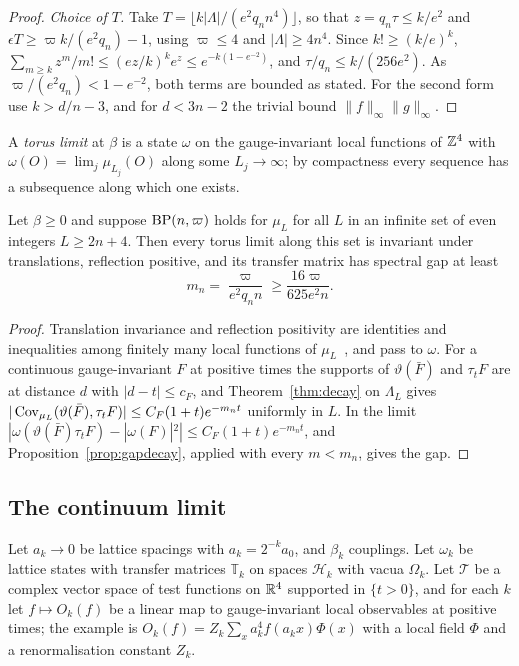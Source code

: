 \begin{proof}
\emph{Choice of $T$.} Take $T=\lfloor k|\Lambda|/(e^2q_nn^4)\rfloor$, so that
$z=q_n\tau\le k/e^2$ and $\epsilon T\ge\varpi k/(e^2q_n)-1$, using $\varpi\le4$
and $|\Lambda|\ge4n^4$. Since $k!\ge(k/e)^k$, $\sum_{m\ge k}z^m/m!\le(ez/k)^ke^z\le
e^{-k(1-e^{-2})}$, and $\tau/q_n\le k/(256e^2)$. As $\varpi/(e^2q_n)<1-e^{-2}$,
both terms are bounded as stated. For the second form use $k>d/n-3$, and for
$d<3n-2$ the trivial bound $\|f\|_\infty\|g\|_\infty$.
\end{proof}

A \emph{torus limit} at $\beta$ is a state $\omega$ on the gauge-invariant local
functions of $\mathbb{Z}^4$ with $\omega(O)=\lim_j\mu_{L_j}(O)$ along some $L_j\to\infty$;
by compactness every sequence has a subsequence along which one exists.

\begin{corollary}\label{cor:latticegap}
Let $\beta\ge0$ and suppose $\mathrm{BP}(n,\varpi)$ holds for $\mu_L$ for all $L$ in an
infinite set of even integers $L\ge2n+4$. Then every torus limit along this
set is invariant under translations, reflection positive, and its transfer
matrix has spectral gap at least
\[
m_n=\frac{\varpi}{e^2q_nn}\ge\frac{16\varpi}{625e^2n}.
\]
\end{corollary}

\begin{proof}
Translation invariance and reflection positivity are identities and
inequalities among finitely many local functions of $\mu_L$~\cite{OSei78}, and
pass to $\omega$. For a continuous gauge-invariant $F$ at positive times the
supports of $\vartheta(\bar F)$ and $\tau_tF$ are at distance $d$ with $|d-t|\le
c_F$, and Theorem~\ref{thm:decay} on $\Lambda_L$ gives $|\operatorname{Cov}_{\mu_L}(\vartheta(\bar
F),\tau_tF)|\le C_F(1+t)e^{-m_nt}$ uniformly in $L$. In the limit
$|\omega(\vartheta(\bar F)\tau_tF)-|\omega(F)|^2|\le C_F(1+t)e^{-m_nt}$, and
Proposition~\ref{prop:gapdecay}, applied with every $m<m_n$, gives the gap.
\end{proof}

\subsection{The continuum limit}

Let $a_k\to0$ be lattice spacings with $a_k=2^{-k}a_0$, and $\beta_k$ couplings.
Let $\omega_k$ be lattice states with transfer matrices $\mathbb T_k$ on spaces
$\mathcal H_k$ with vacua $\Omega_k$. Let $\mathcal T$ be a complex vector space of
test functions on $\mathbb{R}^4$ supported in $\{t>0\}$, and for each $k$ let $f\mapsto
O_k(f)$ be a linear map to gauge-invariant local observables at positive
times; the example is $O_k(f)=Z_k\sum_xa_k^4f(a_kx)\Phi(x)$ with a local field
$\Phi$ and a renormalisation constant $Z_k$.

